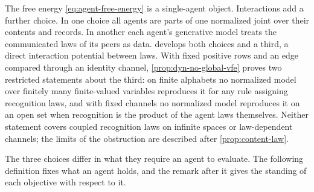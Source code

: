 The free energy \cref{eq:agent-free-energy} is a single-agent object. Interactions add a further choice. In one choice all agents are parts of one normalized joint over their contents and records. In another each agent's generative model treats the communicated laws of its peers as data.  develops both choices and a third, a direct interaction potential between laws. With fixed positive rows and an edge compared through an identity channel, \cref{prop:dyn-no-global-vfe} proves two restricted statements about the third: on finite alphabets no normalized model over finitely many finite-valued variables reproduces it for any rule assigning recognition laws, and with fixed channels no normalized model reproduces it on an open set when recognition is the product of the agent laws themselves. Neither statement covers coupled recognition laws on infinite spaces or law-dependent channels; the limits of the obstruction are described after \cref{prop:content-law}.

The three choices differ in what they require an agent to evaluate. The following definition fixes what an agent holds, and the remark after it gives the standing of each objective with respect to it.

